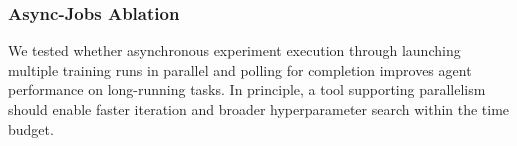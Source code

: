 \documentclass[11pt]{article}
\let\oldtexttt\texttt
\renewcommand{\texttt}[1]{{\fontseries{m}\selectfont\oldtexttt{#1}}}
\newcommand{\kw}[1]{{\textsc{\MakeLowercase{#1}}}}
\theoremstyle{plain}
\theoremstyle{definition}
\theoremstyle{remark}
\begin{document}




\subsubsection{Async-Jobs Ablation} \label{app:async-analysis}

We tested whether asynchronous experiment execution through launching multiple training runs in parallel and polling for completion improves agent performance on long-running tasks. In principle, a tool supporting parallelism should enable faster iteration and broader hyperparameter search within the time budget.
\end{document}
